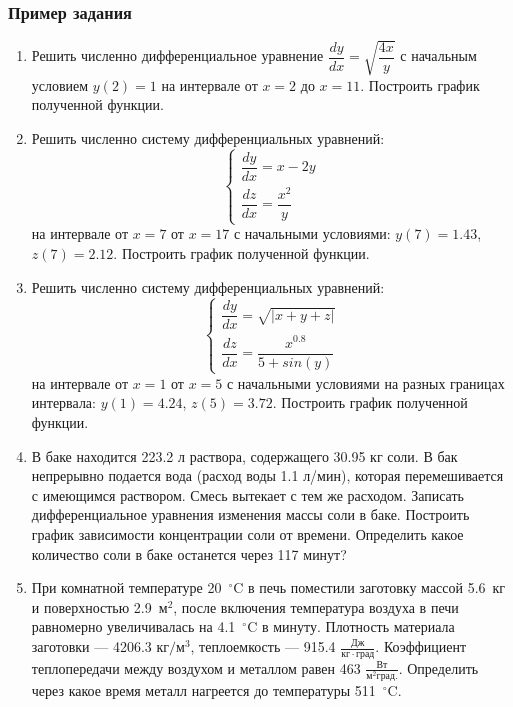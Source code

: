 \subsubsection*{Пример задания}
\begin{enumerate}
	\item Решить численно дифференциальное уравнение $\dfrac{dy}{dx}=\sqrt{\dfrac{4x}{y}}$ с начальным условием $y(2)= 1$ на интервале от $x=     2$ до $x=    11$. Построить график полученной функции.
	
	\item Решить численно систему дифференциальных уравнений:
	\begin{equation*}
	\left\{
	\begin{gathered}
	\dfrac{dy}{dx}=x-2y                  \\
	\dfrac{dz}{dx}=\dfrac{x^2}{y}        
	\end{gathered}
	\right.
	\end{equation*}
	на интервале от $x= 7$ от $x=17$ с начальными условиями: $y( 7)=1.43$, $z( 7)=2.12$. Построить график полученной функции. 
	\item Решить численно систему дифференциальных уравнений:
	\begin{equation*}
	\left\{
	\begin{gathered}
	\dfrac{dy}{dx}=\sqrt{|x+y+z|}\\
	\dfrac{dz}{dx}=\dfrac{x^{0.8}}{5+sin(y)}
	\end{gathered}
	\right.
	\end{equation*}
	на интервале от $x= 1$ от $x= 5$ с начальными условиями на разных границах интервала: $y( 1)=4.24$, $z( 5)=3.72$.  Построить график полученной функции. 
	
	\item  В баке находится 223.2 л раствора, содержащего 30.95 кг соли. В бак непрерывно подается вода (расход воды 1.1 л/мин), которая перемешивается с имеющимся раствором. Смесь вытекает с тем же расходом. Записать дифференциальное уравнения изменения массы соли в баке. Построить график зависимости концентрации соли от времени. Определить какое количество соли в баке останется через  117 минут?
	
	\item  При комнатной температуре 20~$^\circ\mathrm{C}$ в печь поместили заготовку массой 5.6~кг и поверхностью 2.9~$\text{м}^2$, после включения температура воздуха в печи равномерно увеличивалась на 4.1~$^\circ\mathrm{C}$ в минуту. Плотность материала заготовки --- 4206.3 $\text{кг}/\text{м}^\mathrm{3}$, теплоемкость --- 915.4 $\frac{\text{Дж}}{\text{кг} \cdot град}$. Коэффициент теплопередачи между воздухом и металлом равен   463 $\frac{Вт}{м^2 град.}$. Определить через какое время металл нагреется до температуры   511~$^\circ\mathrm{C}$.
\end{enumerate}
